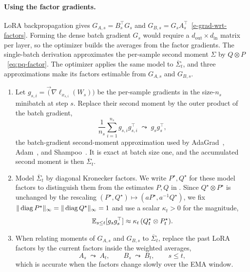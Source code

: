 \paragraph{Using the factor gradients.} LoRA backpropagation gives
$G_{A,s}=B_s^\top G_s$ and
$G_{B,s}=G_sA_s^\top$~\eqref{e-grad-wrt-factors}. Forming the dense batch
gradient $G_s$ would require a $d_{\mathrm{out}}\times d_{\mathrm{in}}$
matrix per layer, so the optimizer builds the averages from the factor
gradients. The single-batch derivation approximates the per-sample second
moment $\Sigma$ by $Q\otimes P$~\eqref{eq:pq-factor}. The optimizer applies
the same model to $\overline{\Sigma}_t$, and three approximations make its
factors estimable from $G_{A,s}$ and $G_{B,s}$.
\begin{enumerate}[leftmargin=1.6em,itemsep=2pt,topsep=2pt]
  \item Let
  $g_{s,i}=\vec(\nabla\ell_{x_{s,i}}(W_s))$ be the per-sample gradients in
  the size-$n_s$ minibatch at step $s$. Replace their second moment by the
  outer product of the batch gradient,
  \[
    \frac1{n_s}\sum_{i=1}^{n_s}g_{s,i}g_{s,i}^\top
    \;\leadsto\;
    g_sg_s^\top ,
  \]
  the batch-gradient second-moment approximation used by
  AdaGrad~\cite{adagrad}, Adam~\cite{adam}, and Shampoo~\cite{shampoo}.
  It is exact at batch size one, and the accumulated second moment is then
  $\overline{\Sigma}_t$.
  \item Model $\overline{\Sigma}_t$ by diagonal Kronecker factors. We write
  $P^\star,Q^\star$ for these model factors to distinguish them from the
  estimates $P,Q$ in . Since
  $Q^\star\otimes P^\star$ is unchanged by the
  rescaling $(P^\star,Q^\star)\mapsto(aP^\star,a^{-1}Q^\star)$, we fix
  $\| \operatorname{diag} P^\star\|_\infty=\| \operatorname{diag} Q^\star\|_\infty=1$ and use a
  scalar $\kappa_t>0$ for the magnitude,
  \begin{equation}\label{e-diag-kron-second-mom-model-02}
    \mathbb{E}_{s \leq t}[g_sg_s^\top]\approx\kappa_t\,(Q^\star_t\otimes P^\star_t).
  \end{equation}
  \item When relating moments of $G_{A,s}$ and $G_{B,s}$ to $\overline{\Sigma}_t$, replace
  the past LoRA factors by the current factors inside the weighted averages,
  \[
    A_s\;\leadsto\;A_t,\qquad B_s\;\leadsto\;B_t,\qquad s\le t,
  \]
  which is accurate when the factors change slowly over the EMA window.
\end{enumerate}

